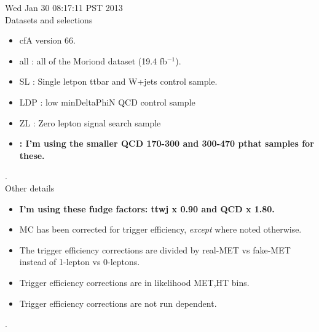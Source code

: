 \documentclass[11pt]{article}
\begin{document}
   Wed Jan 30 08:17:11 PST 2013 \\

   Datasets and selections
   \begin{itemize}
     \item cfA version 66.
     \item all : all of the Moriond dataset (19.4 fb$^{-1}$).
     \item SL : Single letpon ttbar and W+jets control sample.
     \item LDP : low minDeltaPhiN QCD control sample
     \item ZL : Zero lepton signal search sample
     \item {\bf : I'm using the smaller QCD 170-300 and 300-470 pthat samples for these.}
   \end{itemize}

.\\

   Other details
   \begin{itemize}
     \item {\bf I'm using these fudge factors: ttwj x 0.90 and QCD x 1.80.}
     \item MC has been corrected for trigger efficiency, {\it except} where noted otherwise.
     \item  The trigger efficiency corrections are divided by real-MET vs fake-MET
             instead of 1-lepton vs 0-leptons.
     \item Trigger efficiency corrections are in likelihood MET,HT bins.
     \item Trigger efficiency corrections are not run dependent.
   \end{itemize}

.\\



  \pagebreak
  \clearpage
  \tableofcontents
  \clearpage





\end{document}
